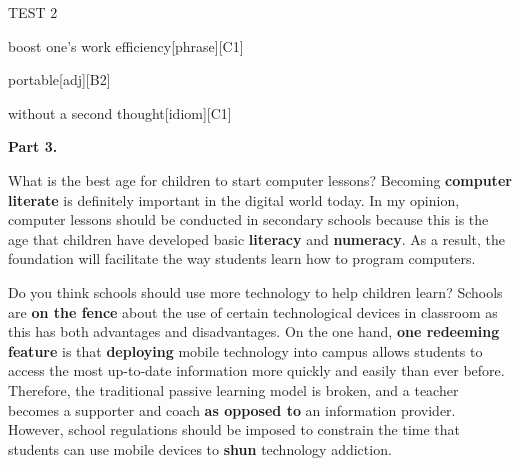 \begin{glossarymc}[Cambridge 13]
\begin{test}{TEST 2}
\begin{VocabExplain}[Part 2]
            \begin{ExplainCard}{boost one’s work efficiency}[phrase][C1]
            \end{ExplainCard}

            \begin{ExplainCard}{portable}[adj][B2]
            \end{ExplainCard}

            \begin{ExplainCard}{without a second thought}[idiom][C1]
            \end{ExplainCard}
        \end{VocabExplain}

    \noindent
    \textbf{Part 3.}
    \begin{qa}{What is the best age for children to start computer lessons?}
    Becoming \textbf{computer literate} is definitely important in the digital world today. In my opinion, computer lessons should be conducted in secondary schools because this is the age that children have developed basic \textbf{literacy} and \textbf{numeracy}. As a result, the foundation will facilitate the way students learn how to program computers.
    \end{qa}

    \begin{qa}{Do you think schools should use more technology to help children learn?}
    Schools are \textbf{on the fence} about the use of certain technological devices in classroom as this has both advantages and disadvantages. On the one hand, \textbf{one redeeming feature} is that \textbf{deploying} mobile technology into campus allows students to access the most up-to-date information more quickly and easily than ever before. Therefore, the traditional passive learning model is broken, and a teacher becomes a supporter and coach \textbf{as opposed to} an information provider. However, school regulations should be imposed to constrain the time that students can use mobile devices to \textbf{shun} technology addiction.
    \end{qa}


\end{test}
\end{glossarymc}
